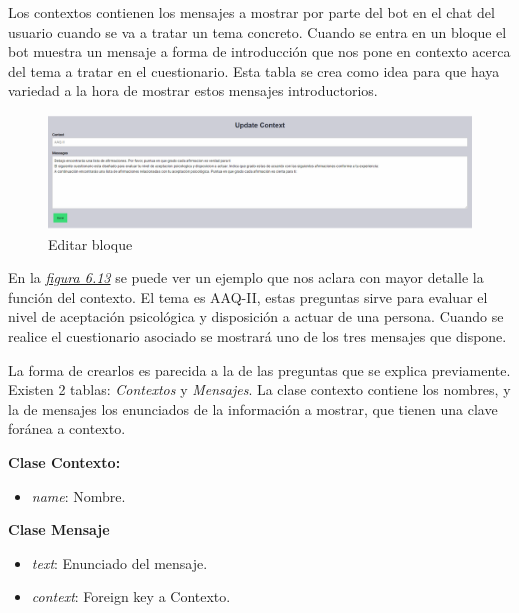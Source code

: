 Los contextos contienen los mensajes a mostrar por parte del bot en el chat del usuario cuando se va a tratar un tema concreto. Cuando se entra en un bloque el bot muestra un mensaje a forma de introducción que nos pone en contexto acerca del tema a tratar en el cuestionario. Esta tabla se crea como idea para que haya variedad a la hora de mostrar estos mensajes introductorios. \vspace{0.7cm}

\begin{figure}[!ht]
    \centering
    \includegraphics[width=1\textwidth]{imagenes/update_context.png}
    \caption{Editar bloque}
    \label{fig:update-bloque}
\end{figure}\vspace{0.7cm}

En la \textit{\hyperref[fig:update-bloque]{figura 6.13}} se puede ver un ejemplo que nos aclara con mayor detalle la función del contexto. El tema es AAQ-II, estas preguntas sirve para evaluar el nivel de aceptación psicológica y disposición a actuar de una persona. Cuando se realice el cuestionario asociado se mostrará uno de los tres mensajes que dispone. 

La forma de crearlos es parecida a la de las preguntas que se explica previamente. Existen 2 tablas: \textit{Contextos} y \textit{Mensajes}. La clase contexto contiene los nombres, y la de mensajes los enunciados de la información a mostrar, que tienen una clave foránea a contexto. 

\textbf{Clase Contexto:}

\begin{itemize}
    \item \textit{name}: Nombre.
\end{itemize}

\textbf{Clase Mensaje}

\begin{itemize}
    \item \textit{text}: Enunciado del mensaje.
    \item \textit{context}: Foreign key a Contexto.
\end{itemize}


